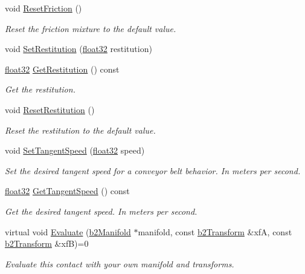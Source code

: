 \begin{DoxyCompactItemize}
void \mbox{\hyperlink{classb2_contact_ad66d9290da187cef4c9f48c5766d4460}{Reset\+Friction}} ()
\begin{DoxyCompactList}\small\item\em Reset the friction mixture to the default value. \end{DoxyCompactList}\item 
void \mbox{\hyperlink{classb2_contact_a24ca342c2bb766c53ef5ad04f5268fc1}{Set\+Restitution}} (\mbox{\hyperlink{b2_settings_8h_aacdc525d6f7bddb3ae95d5c311bd06a1}{float32}} restitution)
\item 
\mbox{\hyperlink{b2_settings_8h_aacdc525d6f7bddb3ae95d5c311bd06a1}{float32}} \mbox{\hyperlink{classb2_contact_a9fb6e637026914c8752f89f91122b561}{Get\+Restitution}} () const
\begin{DoxyCompactList}\small\item\em Get the restitution. \end{DoxyCompactList}\item 
void \mbox{\hyperlink{classb2_contact_a243501bc5c146e9eb1296162d328aef1}{Reset\+Restitution}} ()
\begin{DoxyCompactList}\small\item\em Reset the restitution to the default value. \end{DoxyCompactList}\item 
void \mbox{\hyperlink{classb2_contact_a32033914a6c7f35b469e8fddbc17c566}{Set\+Tangent\+Speed}} (\mbox{\hyperlink{b2_settings_8h_aacdc525d6f7bddb3ae95d5c311bd06a1}{float32}} speed)
\begin{DoxyCompactList}\small\item\em Set the desired tangent speed for a conveyor belt behavior. In meters per second. \end{DoxyCompactList}\item 
\mbox{\hyperlink{b2_settings_8h_aacdc525d6f7bddb3ae95d5c311bd06a1}{float32}} \mbox{\hyperlink{classb2_contact_a927125db0b36947a3bb53c4e3eded1cd}{Get\+Tangent\+Speed}} () const
\begin{DoxyCompactList}\small\item\em Get the desired tangent speed. In meters per second. \end{DoxyCompactList}\item 
virtual void \mbox{\hyperlink{classb2_contact_ae3c2842e5325b2d4500f8ed1d4de2f72}{Evaluate}} (\mbox{\hyperlink{structb2_manifold}{b2\+Manifold}} $\ast$manifold, const \mbox{\hyperlink{structb2_transform}{b2\+Transform}} \&xfA, const \mbox{\hyperlink{structb2_transform}{b2\+Transform}} \&xfB)=0
\begin{DoxyCompactList}\small\item\em Evaluate this contact with your own manifold and transforms. \end{DoxyCompactList}\end{DoxyCompactItemize}
